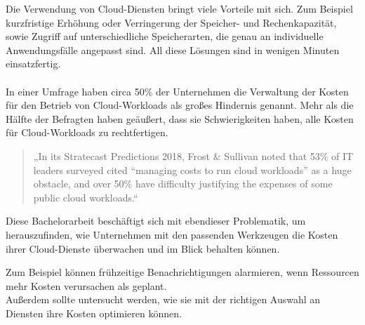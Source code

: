 \begin{comment}
\\\\
”Heute hatten wir 17 Gäste für unsere derzeit 20 Zimmer. Für die kommende Messe am Wochenende sind wir bereit 500 Gäste zu empfangen. Nach der Messe werden wir mit unseren üblichen 20 Zimmern wie immer gut arbeiten können.”
Normalerweise bräuchte man eine große Investition zu machen, um solche kurzfristige Nachfrage zu erfüllen. Vergleichbar ist es bei traditionellen IT-Infrastrukturen, mehr Kapazitätsbedarf, würde die Anschaffung von einer neuen Hardware bedeuten.
\\\\
\end{comment}
Die Verwendung von Cloud-Diensten bringt viele Vorteile mit sich. Zum Beispiel kurzfristige Erhöhung oder Verringerung der Speicher- und Rechenkapazität, sowie Zugriff auf unterschiedliche Speicherarten, die genau an individuelle Anwendungsfälle angepasst sind. All diese Lösungen sind in wenigen Minuten einsatzfertig. 
\\\\
In einer Umfrage haben circa 50\% der Unternehmen die Verwaltung der Kosten für den Betrieb von Cloud-Workloads als großes Hindernis genannt. Mehr als die Hälfte der Befragten haben geäußert, dass sie Schwierigkeiten haben, alle Kosten für Cloud-Workloads zu rechtfertigen.
\begin{quote}
    „In its Stratecast Predictions 2018, Frost \& Sullivan noted that 53\% of IT leaders surveyed cited “managing costs to run cloud workloads” as a huge obstacle, and over 50\% have difficulty justifying the expenses of some public cloud workloads.“  
    {\cite{SP1}}
    \end{quote}

\begin{flushleft}
Diese Bachelorarbeit beschäftigt sich mit ebendieser Problematik, um herauszufinden, wie Unternehmen mit den passenden Werkzeugen die Kosten ihrer Cloud-Dienste überwachen und im Blick behalten können. 

Zum Beispiel können frühzeitige Benachrichtigungen alarmieren, wenn Ressourcen mehr Kosten verursachen als geplant.
\\
Außerdem sollte untersucht werden, wie sie mit der richtigen Auswahl an Diensten ihre Kosten optimieren können.
\end{flushleft}

